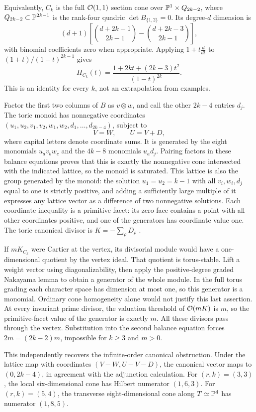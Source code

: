 Equivalently, $C_k$ is the full $\mathcal O(1,1)$ section cone over $\mathbb P^1\times Q_{2k-2}$, where $Q_{2k-2}\subset\mathbb P^{2k-1}$ is the rank-four quadric $\det B_{\{1,2\}}=0$. Its degree-$d$ dimension is
\[
 (d+1)\left[\binom{d+2k-1}{2k-1}-\binom{d+2k-3}{2k-1}\right],
\]
with binomial coefficients zero when appropriate. Applying $1+t\frac{d}{dt}$ to $(1+t)/(1-t)^{2k-1}$ gives
\[
 H_{C_k}(t)=\frac{1+2kt+(2k-3)t^2}{(1-t)^{2k}}.
\]
This is an identity for every $k$, not an extrapolation from examples.

Factor the first two columns of $B$ as $v\otimes w$, and call the other $2k-4$ entries $d_j$. The toric monoid has nonnegative coordinates $(u_1,u_2,v_1,v_2,w_1,w_2,d_1,\ldots,d_{2k-4})$, subject to
\[
 V=W,\qquad U=V+D,
\]
where capital letters denote coordinate sums. It is generated by the eight monomials $u_av_bw_c$ and the $4k-8$ monomials $u_ad_j$. Pairing factors in these balance equations proves that this is exactly the nonnegative cone intersected with the indicated lattice, so the monoid is saturated. This lattice is also the group generated by the monoid: the solution $u_1=u_2=k-1$ with all $v_i,w_i,d_j$ equal to one is strictly positive, and adding a sufficiently large multiple of it expresses any lattice vector as a difference of two nonnegative solutions. Each coordinate inequality is a primitive facet: its zero face contains a point with all other coordinates positive, and one of the generators has coordinate value one. The toric canonical divisor is $K=-\sum_\rho D_\rho$ \cite[Theorem~8.2.3]{CLS11}.

If $mK_{C_k}$ were Cartier at the vertex, its divisorial module would have a one-dimensional quotient by the vertex ideal. That quotient is torus-stable. Lift a weight vector using diagonalizability, then apply the positive-degree graded Nakayama lemma to obtain a generator of the whole module. In the full torus grading each character space has dimension at most one, so this generator is a monomial. Ordinary cone homogeneity alone would not justify this last assertion. At every invariant prime divisor, the valuation threshold of $\mathcal O(mK)$ is $m$, so the primitive-facet value of the generator is exactly $m$. All these divisors pass through the vertex. Substitution into the second balance equation forces $2m=(2k-2)m$, impossible for $k\ge3$ and $m>0$.

This independently recovers the infinite-order canonical obstruction. Under the lattice map with coordinates $(V-W,U-V-D)$, the canonical vector maps to $(0,2k-4)$, in agreement with the adjunction calculation. For $(r,k)=(3,3)$, the local six-dimensional cone has Hilbert numerator $(1,6,3)$. For $(r,k)=(5,4)$, the transverse eight-dimensional cone along $T\simeq\mathbb P^4$ has numerator $(1,8,5)$.
